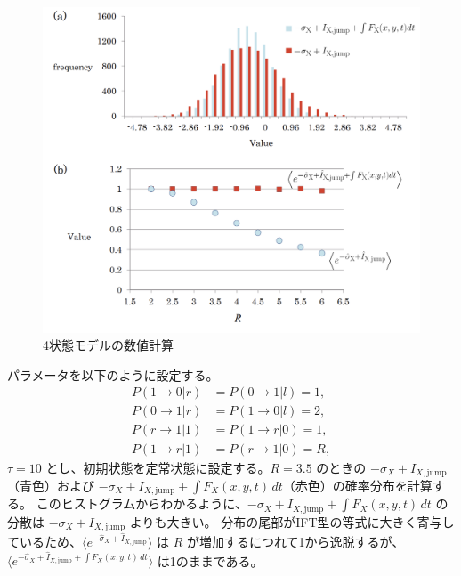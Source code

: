 \documentclass[a4paper,11pt]{jsarticle}
\numberwithin{equation}{section}
\begin{document}
\begin{figure}[H]
    \begin{center}
    \includegraphics[width=120mm]{4s.png}
    \end{center}
    \caption{4状態モデルの数値計算}
    \label{fig:4s}
\end{figure}

パラメータを以下のように設定する。
\begin{align*}
P(1 \to 0 | r) &= P(0 \to 1 | l) = 1, \\
P(0 \to 1 | r) &= P(1 \to 0 | l) = 2, \\
P(r \to 1 | 1) &= P(1 \to r | 0) = 1, \\
P(1 \to r | 1) &= P(r \to 1 | 0) = R,
\end{align*}
\(\tau = 10\) とし、初期状態を定常状態に設定する。\( R = 3.5 \) のときの \( -\sigma_X + I_{X, \text{jump}} \)（青色）および \( -\sigma_X + I_{X, \text{jump}} + \int F_X(x, y, t) \, dt \)（赤色）の確率分布を計算する。
このヒストグラムからわかるように、\( -\sigma_X + I_{X, \text{jump}} + \int F_X(x, y, t) \, dt \) の分散は \( -\sigma_X + I_{X, \text{jump}} \) よりも大きい。
分布の尾部がIFT型の等式に大きく寄与しているため、\( \langle e^{-\hat{\sigma}_X + \hat{I}_{X, \text{jump}}} \rangle \) は \( R \) が増加するにつれて1から逸脱するが、
\( \langle e^{-\hat{\sigma}_X + \hat{I}_{X, \text{jump}} + \int F_X(x, y, t) \, dt} \rangle \) は1のままである。
\end{document}
